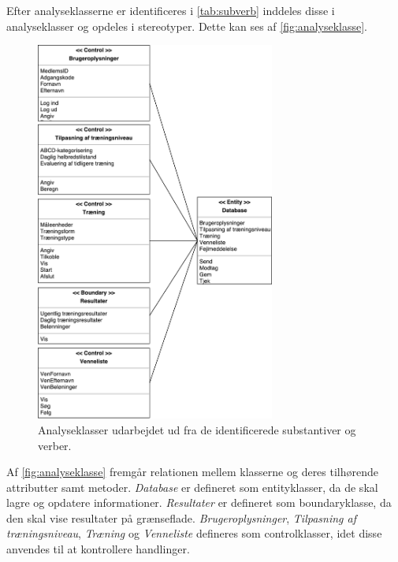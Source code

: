 \noindent
Efter analyseklasserne er identificeres i  \autoref{tab:subverb} inddeles disse i analyseklasser og opdeles i stereotyper. Dette kan ses af \autoref{fig:analyseklasse}. 

\begin{figure}[H]
\centering
\includegraphics[width=0.7\textwidth]{figures/aktivitetsdiagram/analyseklasser}
\caption{Analyseklasser udarbejdet ud fra de identificerede substantiver og verber.}
\label{fig:analyseklasse}
\end{figure}

\noindent
Af \autoref{fig:analyseklasse} fremgår relationen mellem klasserne og deres tilhørende attributter samt metoder.  \textit{Database} er defineret som entityklasser, da de skal lagre og opdatere informationer. \textit{Resultater} er defineret som boundaryklasse, da den skal vise resultater på grænseflade.  \textit{Brugeroplysninger}, \textit{Tilpasning af træningsniveau}, \textit{Træning} og \textit{Venneliste} defineres som controlklasser, idet disse anvendes til at kontrollere handlinger. 

